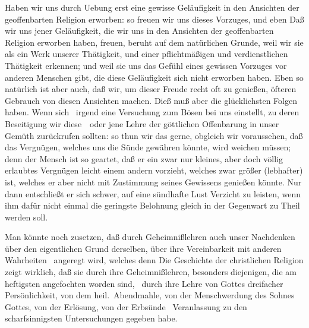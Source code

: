 \begin{aufza}
\item Haben wir uns durch Uebung erst eine gewisse Geläufigkeit in den Ansichten der geoffenbarten Religion erworben: so freuen wir uns dieses Vorzuges, und eben  Daß wir uns jener Geläufigkeit, die wir uns in den Ansichten der geoffenbarten Religion erworben haben, freuen, beruht auf dem natürlichen Grunde, weil wir sie als ein Werk unserer Thätigkeit, und einer pflichtmäßigen und verdienstlichen Thätigkeit erkennen; und weil sie uns das Gefühl eines gewissen Vorzuges vor anderen Menschen gibt, die diese Geläufigkeit sich nicht erworben haben. Eben so natürlich ist aber auch, daß wir, um dieser Freude recht oft zu genießen, öfteren Gebrauch von diesen Ansichten machen. Dieß muß aber die glücklichsten Folgen haben. Wenn sich \zB\ irgend eine Versuchung zum Bösen bei uns einstellt, zu deren Beseitigung wir diese~\ oder jene Lehre der göttlichen Offenbarung in unser Gemüth zurückrufen sollten: so thun wir das gerne, obgleich wir voraussehen, daß das Vergnügen, welches uns die Sünde gewähren könnte, wird weichen müssen; denn der Mensch ist so geartet, daß er ein zwar nur kleines, aber doch völlig erlaubtes Vergnügen leicht einem andern vorzieht, welches zwar größer (lebhafter) ist, welches er aber nicht mit Zustimmung seines Gewissens genießen könnte. Nur dann entschließt er sich schwer, auf eine sündhafte Lust Verzicht zu leisten, wenn ihm dafür nicht einmal die geringste Belohnung gleich in der Gegenwart zu Theil werden soll.

\begin{RWanm}  Man könnte noch zusetzen, daß durch Geheimnißlehren auch unser Nachdenken über den eigentlichen Grund derselben, über ihre Vereinbarkeit mit anderen Wahrheiten \udgl\  angeregt wird, welches denn  Die Geschichte der christlichen Religion zeigt wirklich, daß sie durch ihre Geheimnißlehren, besonders diejenigen, die am heftigsten angefochten worden sind, \zB\ durch ihre Lehre von Gottes dreifacher Persönlichkeit, von dem heil.\ Abendmahle, von der Menschwerdung des Sohnes Gottes, von der Erlösung, von der Erbsünde \uma\  Veranlassung zu den scharfsinnigsten Untersuchungen gegeben habe.\end{RWanm}
\end{aufza}


